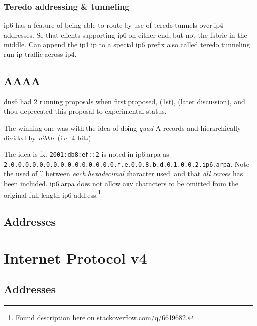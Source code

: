 \subsubsection[Teredo]{Teredo addressing \& tunneling}

ip6 has a feature of being able to route by use of teredo tunnels over ip4 addresses. So that clients supporting ip6 on either end, but not the fabric in the middle. Can append the ip4 ip to a special ip6 prefix also called teredo tunneling run ip traffic across ip4.

\subsection{AAAA}

\gls{dns6} had 2 running proposals when first proposed,  (1st),  (later discussion), and  thou deprecated this proposal to experimental status.

The winning one was  with the idea of doing \textit{quad}-A records and hierarchically divided by \textit{nibble} {\small (i.e. 4 bits)}.

The idea is fx. \texttt{2001:db8:ef::2} is noted in ip6.arpa as \texttt{2.0.0.0.0.0.0.0.0.0.0.0.0.0.0.0.f.e.0.0.8.b.d.0.1.0.0.2.ip6.arpa}. {\small Note the used of '.' between \textit{each} \textit{hexadecimal} character used, and that \textit{all zeroes} has been included. ip6.arpa does not allow any characters to be omitted from the original full-length \gls{ip6} address.}\footnote{Found description \href{https://stackoverflow.com/q/6619682}{here} on stackoverflow.com/q/6619682.}

\subsection{Addresses}


\section[IPv4]{Internet Protocol v4}

\subsection{Addresses}

